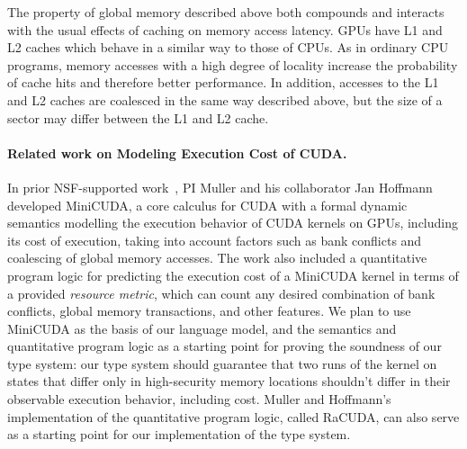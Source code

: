 The property of global memory described above both compounds and interacts with
the usual effects of caching on memory access latency.
%
GPUs have L1 and L2 caches which behave in a similar way to those of CPUs.
%
As in ordinary CPU programs, memory accesses with a high degree of locality increase the probability of cache hits and therefore better performance.
%
In addition, accesses to the L1 and L2 caches are coalesced in the same way described above, but the size of a sector may differ between the L1 and L2 cache.





\paragraph{Related work on Modeling Execution Cost of CUDA.}
In prior NSF-supported work~\cite{MullerHo21}, PI Muller and his collaborator Jan Hoffmann developed MiniCUDA, a core calculus for CUDA with a formal dynamic semantics modelling the execution behavior of CUDA kernels on GPUs, including its cost of execution, taking into account factors such as bank conflicts and coalescing of global memory accesses.
%
The work also included a quantitative program logic for predicting the execution cost of a MiniCUDA kernel in terms of a provided {\em resource metric}, which can count any desired combination of bank conflicts, global memory transactions, and other features.
%
We plan to use MiniCUDA as the basis of our language model, and the semantics and quantitative program logic as a starting point for proving the soundness of our type system: our type system should guarantee that two runs of the kernel on states that differ only in high-security memory locations shouldn't differ in their observable execution behavior, including cost.
%
Muller and Hoffmann's implementation of the quantitative program logic, called RaCUDA, can also serve as a starting point for our implementation of the type system.

